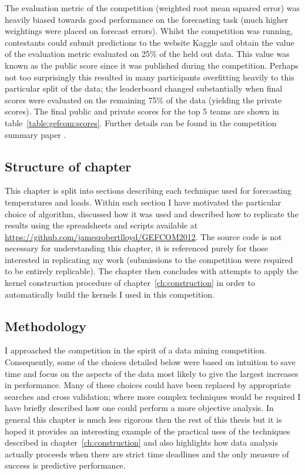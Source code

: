 The evaluation metric of the competition (weighted root mean squared error) was heavily biased towards good performance on the forecasting task (much higher weightings were placed on forecast errors).
Whilst the competition was running, contestants could submit predictions to the website Kaggle and obtain the value of the evaluation metric evaluated on 25\% of the held out data.
This value was known as the public score since it was published during the competition.
Perhaps not too surprisingly this resulted in many participants overfitting heavily to this particular split of the data; the leaderboard changed substantially when final scores were evaluated on the remaining 75\% of the data (yielding the private scores).
The final public and private scores for the top 5 teams are shown in table~\ref{table:gefcom:scores}.
Further details can be found in the competition summary paper \citep{Hong2014-yf}.

\subsection{Structure of chapter}

This chapter is split into sections describing each technique used for forecasting temperatures and loads.
Within each section I have motivated the particular choice of algorithm, discussed how it was used and described how to replicate the results using the spreadsheets and scripts available at \url{https://github.com/jamesrobertlloyd/GEFCOM2012}.
The source code is not necessary for understanding this chapter, it is referenced purely for those interested in replicating my work (submissions to the competition were required to be entirely replicable).
The chapter then concludes with attempts to apply the kernel construction procedure of chapter~\ref{ch:construction} in order to automatically build the kernels I used in this competition.

\subsection{Methodology}

I approached the competition in the spirit of a data mining competition.
Consequently, some of the choices detailed below were based on intuition to save time and focus on the aspects of the data most likely to give the largest increases in performance.
Many of these choices could have been replaced by appropriate searches and cross validation; where more complex techniques would be required I have briefly described how one could perform a more objective analysis.
In general this chapter is much less rigorous then the rest of this thesis but it is hoped it provides an interesting example of the practical uses of the techniques described in chapter~\ref{ch:construction} and also highlights how data analysis actually proceeds when there are strict time deadlines and the only measure of success is predictive performance.

